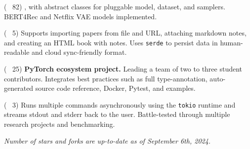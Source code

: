 
\begin{cvlist}

  \cvlistitem
    {\href{https://github.com/jaywonchung/BERT4Rec-VAE-Pytorch}{} 
    {\normalfont( \faCodeFork~82)}} %
    {, with abstract classes for pluggable model, dataset, and samplers. BERT4Rec and Netflix VAE models implemented.} %

  \cvlistitem
    {\href{https://github.com/jaywonchung/reason}{}
    {\normalfont( \faCodeFork~5)}} %
    { Supports importing papers from file and URL, attaching markdown notes, and creating an HTML book with notes. Uses \texttt{serde} to persist data in human-readable and cloud sync-friendly format.} %

  \cvlistitem
    {\href{https://github.com/SymbioticLab/Zeus}{}
    {\normalfont( \faCodeFork~25)}} %
    { \textbf{PyTorch ecosystem project.} Leading a team of two to three student contributors. Integrates best practices such as full type-annotation, auto-generated source code reference, Docker, Pytest, and examples.} %

  \cvlistitem
    {\href{https://github.com/jaywonchung/pegasus}{}
    {\normalfont( \faCodeFork~3)}} %
    { Runs multiple commands asynchronously using the \texttt{tokio} runtime and streams stdout and stderr back to the user. Battle-tested through multiple research projects and benchmarking.} %

\end{cvlist}

\vspace{-5mm}

\begin{cvparagraph}
\textit{Number of stars and forks are up-to-date as of September 6th, 2024.}
\end{cvparagraph}
